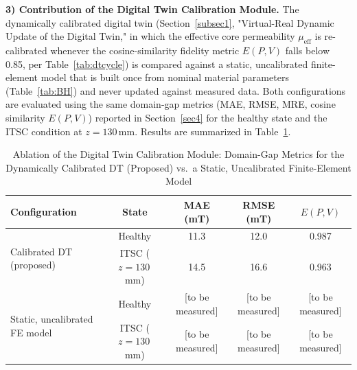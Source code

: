 \textbf{3) Contribution of the Digital Twin Calibration Module.}
The dynamically calibrated digital twin (Section~\ref{subsec1},
"Virtual-Real Dynamic Update of the Digital Twin," in which the
effective core permeability $\mu_{\mathrm{eff}}$ is re-calibrated
whenever the cosine-similarity fidelity metric $E(P,V)$ falls below
0.85, per Table~\ref{tab:dtcycle}) is compared against a static,
uncalibrated finite-element model that is built once from nominal
material parameters (Table~\ref{tab:BH}) and never updated against
measured data. Both configurations are evaluated using the same
domain-gap metrics (MAE, RMSE, MRE, cosine similarity $E(P,V)$) reported
in Section~\ref{sec4} for the healthy state and the ITSC condition at
$z = 130$\,mm. Results are summarized in Table~\ref{tab:ablation_dt}.

\begin{table}[ht]
\centering
\caption{\label{tab:ablation_dt}%
Ablation of the Digital Twin Calibration Module: Domain-Gap Metrics for
the Dynamically Calibrated DT (Proposed) vs.\ a Static, Uncalibrated
Finite-Element Model}
\begin{tabular}{|l|c|c|c|c|}
\hline
\textbf{Configuration} & \textbf{State} & \textbf{MAE (mT)} & \textbf{RMSE (mT)} & \textbf{$E(P,V)$} \\
\hline
\multirow{2}{*}{Calibrated DT (proposed)}
 & Healthy & 11.3 & 12.0 & 0.987 \\
 & ITSC ($z=130$\,mm) & 14.5 & 16.6 & 0.963 \\
\hline
\multirow{2}{*}{Static, uncalibrated FE model}
 & Healthy & [to be measured] & [to be measured] & [to be measured] \\
 & ITSC ($z=130$\,mm) & [to be measured] & [to be measured] & [to be measured] \\
\hline
\end{tabular}
\end{table}


